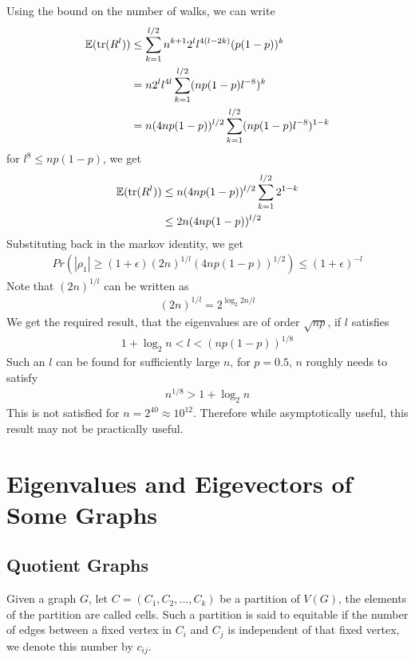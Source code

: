 \documentclass{math}
\newcommand{\expect}{\mathbb{E}}
\newcommand{\prob}{Pr}
\begin{document}
Using the bound on the number of walks, we can write
\begin{align*}
    \expect(\trace(R^l)) & \leq \sum_{k=1}^{l/2} n^{k + 1}2^ll^{4(l - 2k)} (p(1-p))^k  \\
                         & = n 2^l l^{4l} \sum_{k=1}^{l/2} (np(1-p)l^{-8})^k           \\
                         & = n (4np(1-p))^{l/2} \sum_{k=1}^{l/2} (np(1-p)l^{-8})^{1-k}
\end{align*}
for $l^8 \leq np(1-p)$, we get
\begin{align*}
    \expect(\trace(R^l)) & \leq n (4np(1-p))^{l/2} \sum_{k=1}^{l/2} 2^{1-k} \\
                         & \leq 2n(4np(1-p))^{l/2}
\end{align*}
Substituting back in the markov identity, we get
\begin{align*}
    \prob(|\rho_1| \geq (1 + \epsilon) (2n)^{1/l}(4np(1-p))^{1/2}) \leq (1 + \epsilon)^{-l}
\end{align*}
Note that $(2n)^{1/l}$ can be written as
\begin{align*}
    (2n)^{1/l} = 2^{\log_2{2n}/l}
\end{align*}
We get the required result, that the eigenvalues are of order $\sqrt{np}$, if $l$ satisfies
\begin{align*}
    1 + \log_2{n} < l < (np(1-p))^{1/8}
\end{align*}
Such an $l$ can be found for sufficiently large $n$, for $p = 0.5$, $n$ roughly needs to satisfy
\begin{align*}
    n^{1/8} > 1 + \log_2 n
\end{align*}
This is not satisfied for $n = 2^{40} \approx 10^{12}$.
Therefore while asymptotically useful, this result may not be practically useful.

\section{Eigenvalues and Eigevectors of Some Graphs}

\subsection{Quotient Graphs}

\begin{definition}
    Given a graph $G$, let $C = (C_1, C_2, ..., C_k)$ be a partition of $V(G)$, the elements of the partition are called cells.
    Such a partition is said to equitable if the number of edges between a fixed vertex in $C_i$ and $C_j$
    is independent of that fixed vertex, we denote this number by $c_{ij}$.        
\end{definition}
\end{document}
